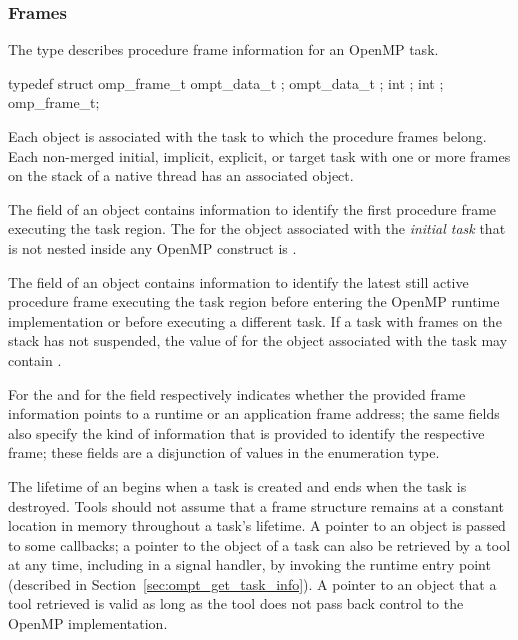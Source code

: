 \subsubsection{Frames}
\label{sec:omp_frame_t}
\summary
The  type describes procedure frame information for an OpenMP task.

\syntax
\begin{ccppspecific}
\begin{ompSyntax}
typedef struct omp_frame_t {
  ompt_data_t ;
  ompt_data_t ;
  int ;
  int ;
} omp_frame_t;
\end{ompSyntax}
\end{ccppspecific}

\descr

Each  object is associated with the task to which the procedure frames belong.
Each non-merged initial, implicit, explicit, or target task with one or more frames on
the stack of a native thread has an associated  object.

The  field of an  object contains
information to identify the first procedure frame executing the 
task region.
The  for the  object associated with 
the \emph{initial task} that is not nested inside any OpenMP construct 
is .

The  field of an  object contains
information to identify the latest still active procedure frame 
executing the task region before entering the OpenMP runtime 
implementation or before executing a different task.
If a task with frames on the stack has not suspended, the value of
 for the  object
associated with the task may contain .

For  the  and for  
the  field respectively indicates whether 
the provided frame information points to a runtime or an 
application frame address;
the same fields also specify the kind of information that is 
provided to identify the respective frame; 
these fields are a disjunction of values in the
 enumeration type.

The lifetime of an  begins when a task is created
and ends when the task is destroyed. Tools should not assume that
a frame structure remains at a constant location in memory throughout
a task's lifetime. 
A pointer to an  object is passed to
some callbacks; a pointer to the  object of a task
can also be retrieved by a tool at any time, including in a signal
handler, by invoking the
 runtime entry point (described in
Section~\ref{sec:ompt_get_task_info}).
A pointer to an  object that a tool retrieved
is valid as long as the tool does not pass back control to the OpenMP
implementation.



